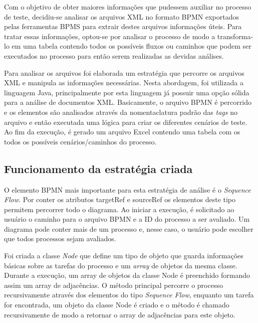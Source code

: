 \documentclass[12pt]{article}
\begin{document}
Com o objetivo de obter maiores informações que pudessem auxiliar no processo de teste, decidiu-se analisar os arquivos XML no formato BPMN exportados pelas ferramentas BPMS para extrair destes arquivos informações úteis. Para tratar essas informações, optou-se por analisar o processo de modo a transforma-lo em uma tabela contendo todos os possíveis fluxos ou caminhos que podem ser executados no processo para então serem realizadas as devidas análises. 

Para analisar os arquivos foi elaborada um estratégia que percorre os arquivos XML e manipula as informações necessárias. Nesta abordagem, foi utilizada a linguagem Java, principalmente por esta linguagem já possuir uma opção sólida para a análise de documentos XML\cite{javadom}. Basicamente, o arquivo BPMN é percorrido e os elementos são analisados através da nomentaclatura padrão das \emph{tags} no arquivo e então executada uma lógica para criar os diferentes cenários de teste. Ao fim da execução, é gerado um arquivo Excel contendo uma tabela com os todos os possíveis cenários/caminhos do processo.


\subsection{Funcionamento da estratégia criada}


O elemento BPMN mais importante para esta estratégia de análise é o \emph{Sequence Flow}. Por conter os atributos targetRef e sourceRef os elementos deste tipo permitem percorrer todo o diagrama. Ao iniciar a execução, é solicitado ao usuário o caminho para o arquivo BPMN e a ID do processo a ser avaliado. Um diagrama pode conter mais de um processo e, nesse caso, o usuário pode escolher que todos processos sejam avaliados.

Foi criada a classe \emph{Node} que define um tipo de objeto que guarda informações básicas sobre as tarefas do processo e um \emph{array} de objetos da mesma classe. Durante a execução, um array de objetos da classe Node é preenchido formando assim um array de adjacências. O método principal percorre o processo recursivamente através dos elementos do tipo \emph{Sequence Flow}, enquanto um tarefa for encontrada, um objeto da classe Node é criado e o método é chamado recursivamente de modo a retornar o array de adjacências para este objeto.
\end{document}
